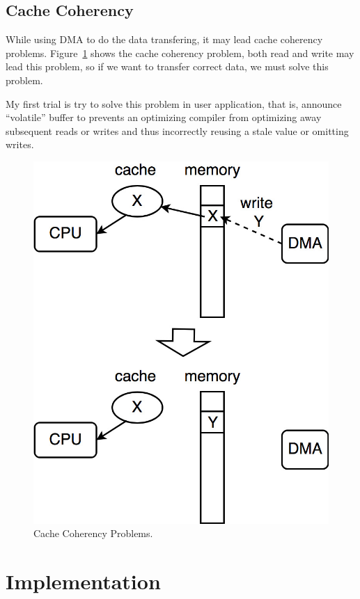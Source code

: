 \subsection{Cache Coherency}
\label{subsec:Cache Coherency}
While using DMA to do the data transfering, it may lead cache coherency problems. Figure~\ref{fig:Cache Coherency Problems.}
shows the cache coherency problem, both read and write may lead this problem, so if we want to 
transfer correct data, we must solve this problem.

My first trial is try to solve this problem in user application, that is, announce ``volatile'' 
buffer to prevents an optimizing compiler from optimizing away subsequent reads or writes and 
thus incorrectly reusing a stale value or omitting writes. 
\begin{figure}[!htb]
  \centering
  \includegraphics[scale=0.5]{images/cache_coherency.jpg}
  \caption[Cache Coherency Problems.]{Cache Coherency Problems.}
  \label{fig:Cache Coherency Problems.}
\end{figure}

\section{Implementation}
\label{sec:Implementation}




